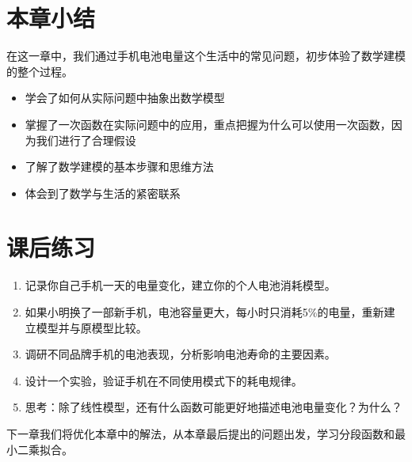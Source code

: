 \section{本章小结}\label{sec:chapter-summary}

在这一章中，我们通过手机电池电量这个生活中的常见问题，初步体验了数学建模的整个过程。

\begin{definitionbox}[title=本章要点]
\begin{itemize}
    \item 学会了如何从实际问题中抽象出数学模型
    \item 掌握了一次函数在实际问题中的应用，重点把握为什么可以使用一次函数，因为我们进行了合理假设
    \item 了解了数学建模的基本步骤和思维方法
    \item 体会到了数学与生活的紧密联系
\end{itemize}
\end{definitionbox}

\section*{课后练习}

\begin{enumerate}
    \item 记录你自己手机一天的电量变化，建立你的个人电池消耗模型。
    
    \item 如果小明换了一部新手机，电池容量更大，每小时只消耗5\%的电量，重新建立模型并与原模型比较。
    
    \item 调研不同品牌手机的电池表现，分析影响电池寿命的主要因素。
    
    \item 设计一个实验，验证手机在不同使用模式下的耗电规律。
    
    \item 思考：除了线性模型，还有什么函数可能更好地描述电池电量变化？为什么？
\end{enumerate}

\begin{warningbox}[title=下章预告]
下一章我们将优化本章中的解法，从本章最后提出的问题出发，学习分段函数和最小二乘拟合。
\end{warningbox}